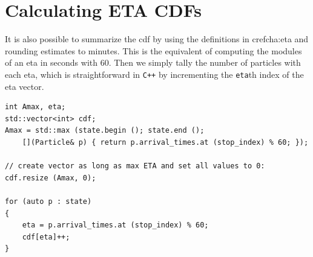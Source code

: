 \section{Calculating ETA CDFs}
\label{app:particle-eta-cdf}

It is also possible to summarize the \gls{cdf} by using the definitions in cref{cha:eta} and rounding estimates to minutes. This is the equivalent of computing the modules of an \gls{eta} in seconds with 60. Then we simply tally the number of particles with each \gls{eta}, which is straightforward in \verb_C++_ by incrementing the \verb+eta+th index of the \gls{eta} vector.


\begin{lstlisting}
int Amax, eta;
std::vector<int> cdf;
Amax = std::max (state.begin (); state.end ();
    [](Particle& p) { return p.arrival_times.at (stop_index) % 60; });

// create vector as long as max ETA and set all values to 0:
cdf.resize (Amax, 0);

for (auto p : state)
{
    eta = p.arrival_times.at (stop_index) % 60;
    cdf[eta]++;
}
\end{lstlisting}
